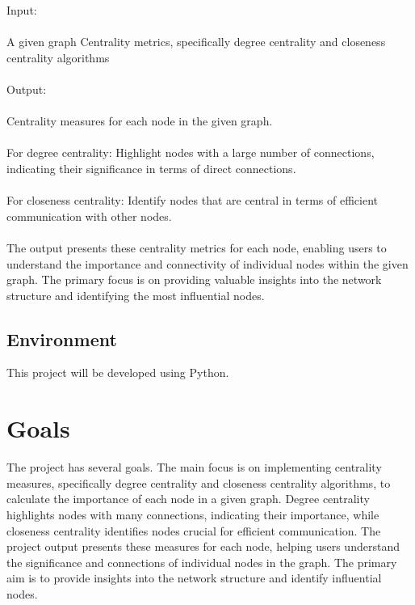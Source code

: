 \documentclass{article}
\begin{document}
Input:\\\\
A given graph Centrality metrics, specifically degree centrality and closeness centrality algorithms\\\\
Output:
\\\\
Centrality measures for each node in the given graph.\\\\
For degree centrality: Highlight nodes with a large number of connections, indicating their significance in terms of direct connections.\\\\
For closeness centrality: Identify nodes that are central in terms of efficient communication with other nodes.\\\\
The output presents these centrality metrics for each node, enabling users to understand the importance and connectivity of individual nodes within the given graph. The primary focus is on providing valuable insights into the network structure and identifying the most influential nodes.\\


\subsection{Environment}

This project will be developed using Python.


\section{Goals}

The project has several goals. The main focus is on implementing centrality measures, specifically degree centrality and closeness centrality algorithms, to calculate the importance of each node in a given graph. Degree centrality highlights nodes with many connections, indicating their importance, while closeness centrality identifies nodes crucial for efficient communication. The project output presents these measures for each node, helping users understand the significance and connections of individual nodes in the graph. The primary aim is to provide insights into the network structure and identify influential nodes.
\end{document}
